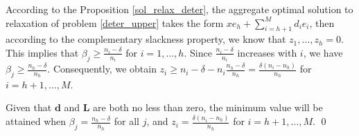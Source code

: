 \begin{pf}
According to the Proposition \ref{sol_relax_deter}, the aggregate optimal solution to relaxation of problem \eqref{deter_upper} takes the form $x e_{h} + \sum_{i=h+1} ^{M} d_{i} e_{i}$, then according to the complementary slackness property, we know that $z_1, \ldots, z_h = 0$. This implies that $\beta_j \geq \frac{n_i - \delta}{n_i}$ for $i = 1,\ldots, h$. Since $\frac{n_i - \delta}{n_i}$ increases with $i$, we have $\beta_j \geq \frac{n_h - \delta}{n_h}$. Consequently, we obtain $z_{i} \geq n_i - \delta - n_i \frac{n_h - \delta}{n_h} = \frac{\delta(n_i-n_h)}{n_h}$ for $i = h+1, \ldots, M$.
  
Given that $\mathbf{d}$ and $\mathbf{L}$ are both no less than zero, the minimum value will be attained when $\beta_j = \frac{n_h - \delta}{n_h}$ for all $j$, and $z_i = \frac{\delta(n_i-n_h)}{n_h}$ for $i = h+1, \ldots, M$.  \qed
\end{pf}







\newpage
